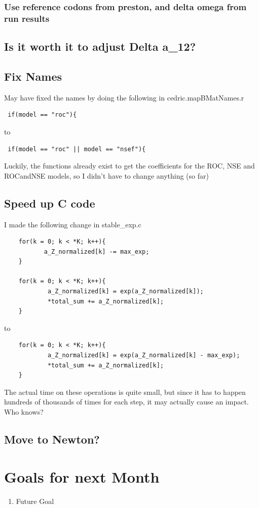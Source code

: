 \subsubsection{Use reference codons from preston, and delta omega from run results}

\subsection{Is it worth it to adjust Delta a\_12?}

\subsection{Fix Names}

May have fixed the names by doing the following in cedric.mapBMatNames.r

\begin{verbatim}
 if(model == "roc"){
\end{verbatim}

to

\begin{verbatim}
 if(model == "roc" || model == "nsef"){
\end{verbatim}

Luckily, the functions already exist to get the coefficients for the ROC, NSE and ROCandNSE models, so I didn't have to change anything (so far)

\subsection{Speed up C code}

I made the following change in stable\_exp.c

\begin{verbatim}
	for(k = 0; k < *K; k++){
	       a_Z_normalized[k] -= max_exp;
	}

	for(k = 0; k < *K; k++){
	        a_Z_normalized[k] = exp(a_Z_normalized[k]);
	        *total_sum += a_Z_normalized[k];
	}
\end{verbatim}

to

\begin{verbatim}
	for(k = 0; k < *K; k++){
	        a_Z_normalized[k] = exp(a_Z_normalized[k] - max_exp);
	        *total_sum += a_Z_normalized[k];
	}
\end{verbatim}

The actual time on these operations is quite small, but since it has to happen hundreds of thousands of times for each step, it may actually cause an impact. Who knows?

\subsection{Move to Newton?}




\section{Goals for next Month}
\begin{enumerate}
\item Future Goal
\end{enumerate}


